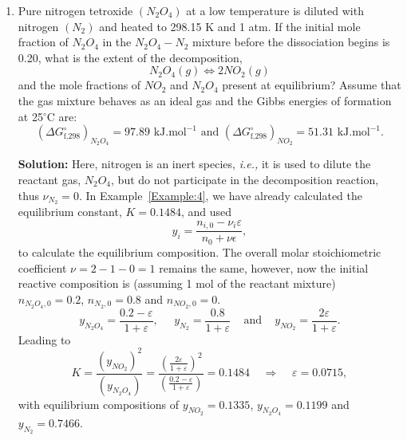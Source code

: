 \documentclass[12pts,a4paper,amsmath,amssymb,floatfix]{article}%
\newcommand{\frc}{\displaystyle\frac}
\newcommand{\ie}{{\it i.e., }}
\newcounter{reaction}
\begin{document}
\begin{enumerate}[1)]
         
\clearpage

\item\label{Example:5} Pure nitrogen tetroxide $\left(N_{2}O_{4}\right)$ at a low temperature is diluted with nitrogen $\left(N_{2}\right)$ and heated to 298.15 K and 1 atm. If the initial mole fraction of $N_{2}O_{4}$ in the $N_{2}O_{4}-N_{2}$ mixture before the dissociation begins is 0.20, what is the extent of the decomposition, 
  \begin{displaymath}
     N_{2}O_{4} (g) \Longleftrightarrow 2 NO_{2} (g)
  \end{displaymath}
  and the mole fractions of $NO_{2}$ and $N_{2}O_{4}$ present at equilibrium? Assume that the gas mixture behaves as an ideal gas and the Gibbs energies of formation at 25$^{\circ}$C are:
  \begin{displaymath}
     \left(\Delta G^{\circ}_{\text{f,298}}\right)_{N_{2}O_{4}} = 97.89 \text{ kJ.mol}^{-1} \text{ and } \left(\Delta G^{\circ}_{\text{f,298}}\right)_{NO_{2}} = 51.31 \text{ kJ.mol}^{-1}.
  \end{displaymath}

\bigskip

{\bf Solution:} Here, nitrogen is an inert species, \ie it is used to dilute the reactant gas, $N_{2}O_{4}$, but do not participate in the decomposition reaction, thus $\nu_{N_{2}}=0$. In Example~\ref{Example:4}, we have already calculated the equilibrium constant, $K = 0.1484$, and used 
         \begin{displaymath}
            y_{i} = \frc{n_{i,0} - \nu_{i}\varepsilon}{n_{0}+\nu\epsilon},
         \end{displaymath}
         to calculate the equilibrium composition. The overall molar stoichiometric coefficient $\nu= 2-1-0 = 1$ remains the same, however, now the initial reactive composition is (assuming 1 mol of the reactant mixture) $n_{N_{2}O_{4},0} = 0.2$, $n_{N_{2},0} = 0.8$ and $n_{NO_{2},0}=0$. 
         \begin{displaymath}
           y_{N_{2}O_{4}} = \frc{0.2-\varepsilon}{1+\varepsilon},\;\;\;\;\; y_{N_{2}} = \frc{0.8}{1+\varepsilon}\;\;\;\text{ and }\;\;\;y_{NO_{2}} = \frc{2\varepsilon}{1+\varepsilon}.
         \end{displaymath}
         Leading to
         \begin{displaymath}
             K = \frac{\left(y_{NO_{2}}\right)^{2}}{\left(y_{N_{2}O_{4}}\right)} = \frc{\left(\frc{2\varepsilon}{1+\varepsilon}\right)^{2}}{\left(\frc{0.2-\varepsilon}{1+\varepsilon}\right)} = 0.1484 \;\;\;\;\Longrightarrow\;\;\;\; \varepsilon = 0.0715,
         \end{displaymath}
         with equilibrium compositions of $y_{NO_{2}} = 0.1335$, $y_{N_{2}O_{4}} = 0.1199$ and $y_{N_{2}} = 0.7466$. 
         

\end{enumerate}
\end{document}
